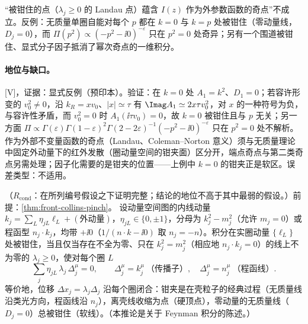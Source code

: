 \begin{proposition}\label{prop:front-landau-not-singular}
“被钳住的点（$\lambda_j\ge0$ 的 Landau 点）蕴含 $I(z)$ 作为外参数函数的奇点”不成立。反例：无质量单圈自能对每个 $p$ 都在 $k=0$ 与 $k=p$ 处被钳住（零动量线，$D_j=0$），而 $\Pi(p^2)\propto(-p^2-\ii0)^{-\varepsilon}$ 只在 $p^2=0$ 处奇异\cite[附录~D.1]{Collins:2020euz}；另有一个围道被钳住、显式分子因子抵消了幂次奇点的一维积分\cite[附录~A]{Collins:2020euz}。
\end{proposition}

\paragraph{地位与缺口。}[V]，证据：显式反例（预印本）。验证：在 $k=0$ 处 $A_1=k^2$、$D_1=0$；若容许形变的 $v_0^2\ne0$，沿 $k_R=xv_0$、$|x|\simeq\tau$ 有 $\Imag A_1\simeq2x\tau v_0^2$，对 $x$ 的一种符号为负，与容许性矛盾，而 $v_0^2=0$ 时 $A_1(\ii\tau v_0)=0$，故 $k=0$ 被钳住且与 $p$ 无关；另一方面 $\Pi\propto\Gamma(\varepsilon)\Gamma(1-\varepsilon)^2\Gamma(2-2\varepsilon)^{-1}(-p^2-\ii0)^{-\varepsilon}$ 只在 $p^2=0$ 处不解析。作为外部不变量函数的奇点（Landau、Coleman--Norton 意义）须与无质量理论中固定外动量下的红外发散（圈动量空间的钳夹面）区分开，端点奇点与第二类奇点另需处理；因子化需要的是钳夹的位置——上例中 $k=0$ 的钳夹正是软区。误差类型：不适用。

\begin{corollary}\label{cor:front-coleman-norton}
（$R_{\mathrm{cond}}$：在所列编号假设之下证明完整；结论的地位不高于其中最弱的假设。）前提：\cref{thm:front-collins-pinch}。
设动量空间图的内线动量 $k_j=\sum_L\eta_{jL}\ell_L+(\text{外动量})$，$\eta_{jL}\in\{0,\pm1\}$，分母为 $k_j^2-m_j^2$（允许 $m_j=0$）或程函型 $n_j\cdot k_j$，均带 $+\ii0$（$1/(n\cdot k-\ii0)$ 取 $n_j=-n$）。积分在实圈动量 $\{\ell_L\}$ 处被钳住，当且仅当存在不全为零、只在 $k_j^2=m_j^2$（相应地 $n_j\cdot k_j=0$）的线上不为零的 $\lambda_j\ge0$，使对每个圈 $L$
\begin{equation}\label{eq:front-cn}
\sum_j\eta_{jL}\,\lambda_j\,\Delta_j^\mu=0,\qquad
\Delta_j^\mu=k_j^\mu\ \text{（传播子）},\quad \Delta_j^\mu=n_j^\mu\ \text{（程函线）}.
\end{equation}
等价地，位移 $\Delta x_j=\lambda_j\Delta_j$ 沿每个圈闭合：钳夹是在壳粒子的经典过程（无质量线沿类光方向，程函线沿 $n_j$），离壳线收缩为点（硬顶点），零动量的无质量线（$D_j=0$）总被钳住（软线）。（本推论是关于 Feynman 积分的陈述。）
\end{corollary}

